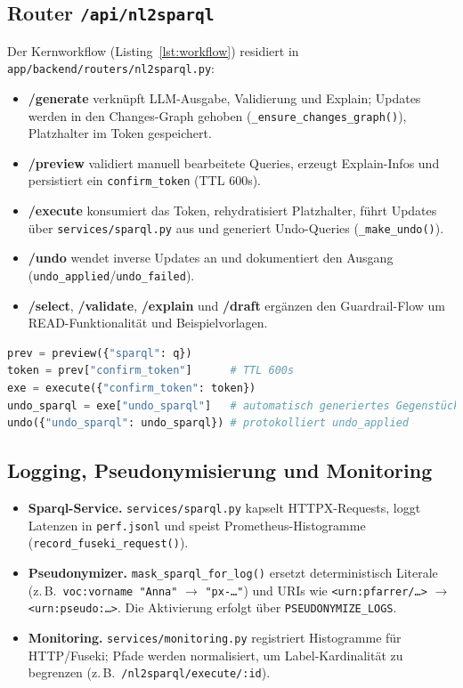\subsection{Router \texttt{/api/nl2sparql}}
Der Kernworkflow (Listing~\ref{lst:workflow}) residiert in \texttt{app/backend/routers/nl2sparql.py}:
\begin{itemize}
  \item \textbf{/generate} verknüpft LLM-Ausgabe, Validierung und Explain; Updates werden in den Changes-Graph gehoben (\texttt{\_ensure\_changes\_graph()}), Platzhalter im Token gespeichert.
  \item \textbf{/preview} validiert manuell bearbeitete Queries, erzeugt Explain-Infos und persistiert ein \texttt{confirm\_token} (TTL 600s).
  \item \textbf{/execute} konsumiert das Token, rehydratisiert Platzhalter, führt Updates über \texttt{services/sparql.py} aus und generiert Undo-Queries (\texttt{\_make\_undo()}).
  \item \textbf{/undo} wendet inverse Updates an und dokumentiert den Ausgang (\texttt{undo\_applied}/\texttt{undo\_failed}).
  \item \textbf{/select}, \textbf{/validate}, \textbf{/explain} und \textbf{/draft} ergänzen den Guardrail-Flow um READ-Funktionalität und Beispielvorlagen.
\end{itemize}

\begin{lstlisting}[language=python,basicstyle=\ttfamily\small,caption={Preview→Execute→Undo im Backend},label={lst:workflow}]
prev = preview({"sparql": q})
token = prev["confirm_token"]      # TTL 600s
exe = execute({"confirm_token": token})
undo_sparql = exe["undo_sparql"]   # automatisch generiertes Gegenstück
undo({"undo_sparql": undo_sparql}) # protokolliert undo_applied
\end{lstlisting}

\subsection{Logging, Pseudonymisierung und Monitoring}
\begin{itemize}
  \item \textbf{Sparql-Service.} \texttt{services/sparql.py} kapselt HTTPX-Requests, loggt Latenzen in \texttt{perf.jsonl} und speist Prometheus-Histogramme (\texttt{record\_fuseki\_request()}).
  \item \textbf{Pseudonymizer.} \texttt{mask\_sparql\_for\_log()} ersetzt deterministisch Literale (z.\,B.\ \texttt{voc:vorname "Anna"} $\rightarrow$ \texttt{"px-\dots"}) und URIs wie \texttt{<urn:pfarrer/\dots>} $\rightarrow$ \texttt{<urn:pseudo:\dots>}. Die Aktivierung erfolgt über \texttt{PSEUDONYMIZE\_LOGS}.
  \item \textbf{Monitoring.} \texttt{services/monitoring.py} registriert Histogramme für HTTP/Fuseki; Pfade werden normalisiert, um Label-Kardinalität zu begrenzen (z.\,B.\ \texttt{/nl2sparql/execute/:id}).
\end{itemize}

